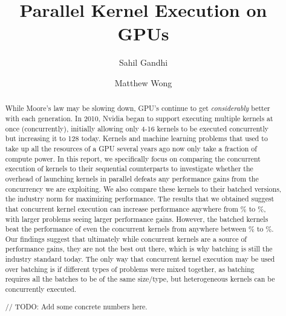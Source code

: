 \documentclass[sigconf]{acmart}
\begin{document}
\title{Parallel Kernel Execution on GPUs}

\author{Sahil Gandhi}
\author{Matthew Wong}
\authornotemark[1]


\renewcommand{\shortauthors}{Gandhi and Wong, et al.}

\begin{abstract}

  While Moore’s law may be slowing down, GPU’s continue to get \textit{considerably} better with each generation. In 2010, Nvidia began to support executing multiple kernels at once (concurrently), initially allowing only 4-16 kernels to be executed concurrently but increasing it to 128 today. Kernels and machine learning problems that used to take up all the resources of a GPU several years ago now only take a fraction of compute power. In this report, we specifically focus on comparing the concurrent execution of kernels to their sequential counterparts to investigate whether the overhead of launching kernels in parallel defeats any performance gains from the concurrency we are exploiting. We also compare these kernels to their batched versions, the industry norm for maximizing performance. 
The results that we obtained suggest that concurrent kernel execution can increase performance anywhere from \% to \%, with larger problems seeing larger performance gains. However, the batched kernels beat the performance of even the concurrent kernels from anywhere between \% to \%. Our findings suggest that ultimately while concurrent kernels are a source of performance gains, they are not the best out there, which is why batching is still the industry standard today. The only way that concurrent kernel execution may be used over batching is if different types of problems were mixed together, as batching requires all the batches to be of the same size/type, but heterogeneous kernels can be concurrently executed.

// TODO: Add some concrete numbers here. 


\end{abstract}
\end{document}
